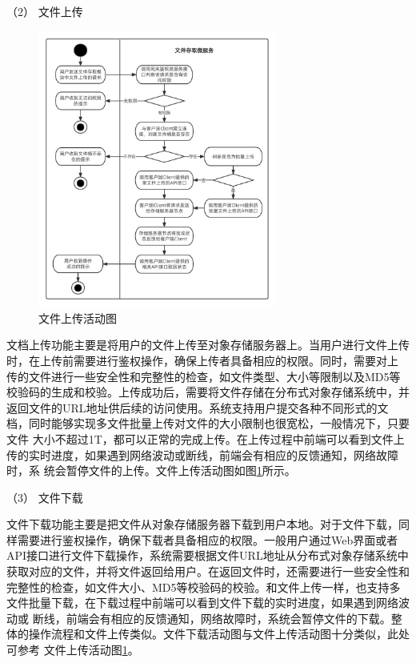 （2） 文件上传

\begin{figure}[htb]
    \centering
    \includegraphics[width=0.7\textwidth]{my_figures/chapter4/文件上传活动图.png}
    \caption{文件上传活动图}
    \label{fig:文件上传活动图}
\end{figure}

文档上传功能主要是将用户的文件上传至对象存储服务器上。当用户进行文件上传时，在上传前需要进行鉴权操作，确保上传者具备相应的权限。同时，需要对上
传的文件进行一些安全性和完整性的检查，如文件类型、大小等限制以及MD5等校验码的生成和校验。上传成功后，需要将文件存储在分布式对象存储系统中，并
返回文件的URL地址供后续的访问使用。系统支持用户提交各种不同形式的文档，同时能够实现多文件批量上传对文件的大小限制也很宽松，一般情况下，只要文件
大小不超过1T，都可以正常的完成上传。在上传过程中前端可以看到文件上传的实时进度，如果遇到网络波动或断线，前端会有相应的反馈通知，网络故障时，系
统会暂停文件的上传。文件上传活动图如图\ref{fig:文件上传活动图}所示。



（3） 文件下载


文件下载功能主要是把文件从对象存储服务器下载到用户本地。对于文件下载，同样需要进行鉴权操作，确保下载者具备相应的权限。一般用户通过Web界面或者
API接口进行文件下载操作，系统需要根据文件URL地址从分布式对象存储系统中获取对应的文件，并将文件返回给用户。在返回文件时，还需要进行一些安全性和
完整性的检查，如文件大小、MD5等校验码的校验。和文件上传一样，也支持多文件批量下载，在下载过程中前端可以看到文件下载的实时进度，如果遇到网络波动或
断线，前端会有相应的反馈通知，网络故障时，系统会暂停文件的下载。整体的操作流程和文件上传类似。文件下载活动图与文件上传活动图十分类似，此处可参考
文件上传活动图\ref{fig:文件上传活动图}。

